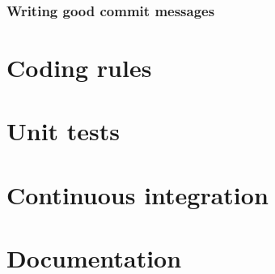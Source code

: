 \subsubsection{Writing good commit messages}



\section{Coding rules}
\section{Unit tests}
\section{Continuous integration}
\section{Documentation}